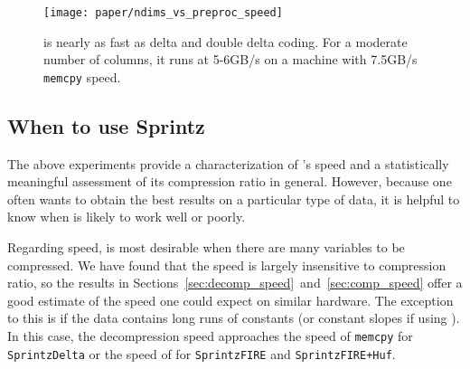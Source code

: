 \begin{figure}[h]
\begin{center}
    \texttt{[image: paper/ndims\_vs\_preproc\_speed]}
    \caption{\fire is nearly as fast as delta and double delta coding. For a moderate number of columns, it runs at 5-6GB/s on a machine with 7.5GB/s \texttt{memcpy} speed.}
    \label{fig:ndims_vs_preproc_speed}
\end{center}
\end{figure}

\subsection{When to use Sprintz} \label{sec:whenSprintz}


The above experiments provide a characterization of \mine's speed and a statistically meaningful assessment of its compression ratio in general. However, because one often wants to obtain the best results on a particular type of data, it is helpful to know when \minesp is likely to work well or poorly.

Regarding speed, \minesp is most desirable when there are many variables to be compressed. We have found that the speed is largely insensitive to compression ratio, so the results in Sections~\ref{sec:decomp_speed}~and~\ref{sec:comp_speed} offer a good estimate of the speed one could expect on similar hardware. The exception to this is if the data contains long runs of constants (or constant slopes if using \justfire). In this case, the decompression speed approaches the speed of \texttt{memcpy} for \texttt{SprintzDelta} or the speed of \fire for \texttt{SprintzFIRE} and \texttt{SprintzFIRE+Huf}.



